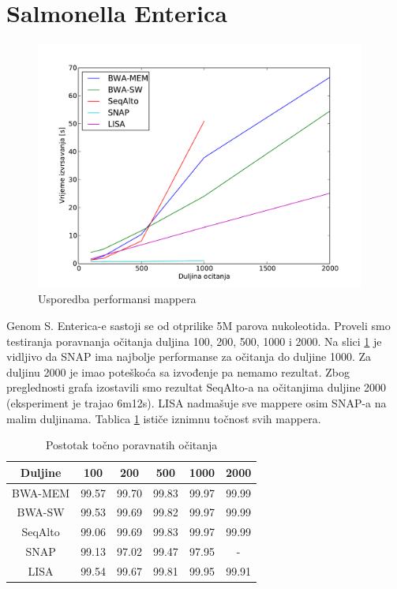 \documentclass[times, utf8, diplomski]{fer}
\begin{document}
\section {Salmonella Enterica}

\begin{figure}[H]
\centering
\includegraphics[width=0.97\textwidth]{../img/salmonella-time.pdf}
\caption{Usporedba performansi mappera}\label{salmonella-time}
\end{figure}

Genom S. Enterica-e sastoji se od otprilike 5M parova nukoleotida. Proveli smo testiranja poravnanja očitanja duljina 100, 200, 500, 1000 i 2000. Na slici \ref{salmonella-time} je vidljivo da SNAP ima najbolje performanse za očitanja do duljine 1000. Za duljinu 2000 je imao poteškoća sa izvođenje pa nemamo rezultat. Zbog preglednosti grafa izostavili smo rezultat SeqAlto-a na očitanjima duljine 2000 (eksperiment je trajao 6m12s). LISA nadmašuje sve mappere osim SNAP-a na malim duljinama. Tablica \ref{salmonella-correct} ističe iznimnu točnost svih mappera.

\begin{table}[H]
\centering
\begin{tabular}{|c||c|c|c|c|c|}
\hline
	Duljine & 100 & 200 & 500 & 1000 & 2000\\
\hline
\hline
	BWA-MEM & 99.57 & 99.70 & 99.83 & 99.97 & 99.99\\
\hline
	BWA-SW  & 99.53 & 99.69 & 99.82 & 99.97 & 99.99\\
\hline
	SeqAlto & 99.06 & 99.69 & 99.83 & 99.97 & 99.99\\
\hline
	SNAP    & 99.13 & 97.02 & 99.47 & 97.95 & -\\
\hline
	LISA    & 99.54 & 99.67 & 99.81 & 99.95 & 99.91\\
\hline
\end{tabular}
\caption{Postotak točno poravnatih očitanja}\label{salmonella-correct}
\end{table}
\end{document}
